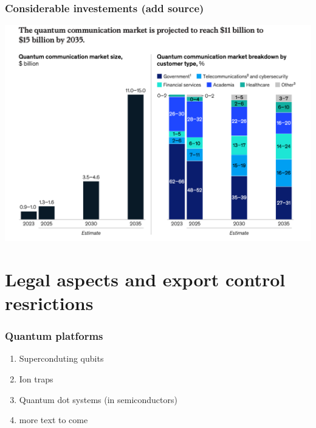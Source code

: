 \documentclass{beamer}
\begin{document}
\begin{frame}
\frametitle{Considerable investements (add source)}


\centerline{\includegraphics[width=0.9\linewidth]{qcfigures/image6.png}}

\end{frame}



    

\section{Legal aspects and export control resrictions}

\begin{frame}
\frametitle{Quantum platforms}

\begin{enumerate}
\item Superconduting qubits
\item Ion traps
\item Quantum dot systems (in semiconductors)
\item more text to come

\end{enumerate}


\end{frame}
\end{document}
